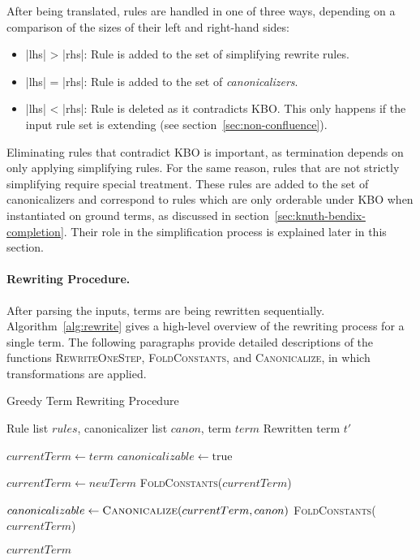 After being translated, rules are handled in one of three ways, depending on a comparison of the sizes of their left and right-hand sides:
\begin{itemize}
	\item |lhs| > |rhs|: Rule is added to the set of simplifying rewrite rules.
	\item |lhs| = |rhs|: Rule is added to the set of \emph{canonicalizers}.
	\item |lhs| < |rhs|: Rule is deleted as it contradicts KBO. This only happens if the input rule set is extending (see section~\ref{sec:non-confluence}).
\end{itemize}
Eliminating rules that contradict KBO is important, as termination depends on only applying simplifying rules. For the same reason, rules that are not strictly simplifying require special treatment. These rules are added to the set of canonicalizers and correspond to rules which are only orderable under KBO when instantiated on ground terms, as discussed in section~\ref{sec:knuth-bendix-completion}. Their role in the simplification process is explained later in this section.

\paragraph{Rewriting Procedure.}
After parsing the inputs, terms are being rewritten sequentially. Algorithm~\ref{alg:rewrite} gives a high-level overview of the rewriting process for a single term. The following paragraphs provide detailed descriptions of the functions \textsc{RewriteOneStep}, \textsc{FoldConstants}, and \textsc{Canonicalize}, in which transformations are applied.

\begin{algorithm}[h]
	\caption{Greedy Term Rewriting Procedure}
	\label{alg:rewrite}
	\begin{algorithmic}[1]
		\Require Rule list $rules$, canonicalizer list $canon$, term $term$
		\Ensure Rewritten term $t'$
		
		\State $currentTerm \gets term$
		\State $canonicalizable \gets \text{true}$
		
		\State $currentTerm \gets newTerm$
		\State \textsc{FoldConstants}($currentTerm$)
		\EndWhile
		
		\State $canonicalizable \gets \textsc{Canonicalize}(currentTerm, canon)$
		\State \textsc{FoldConstants}($currentTerm$)
		\EndWhile
		
		\State \Return $currentTerm$
	\end{algorithmic}
\end{algorithm}


